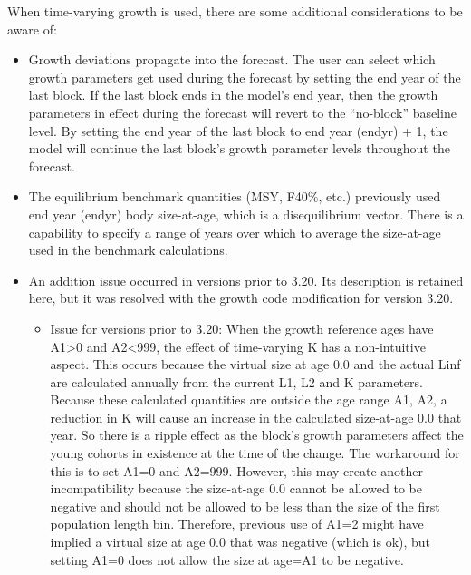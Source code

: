 When time-varying growth is used, there are some additional considerations to be aware of:
\begin{itemize}
	\item Growth deviations propagate into the forecast.  The user can select which growth parameters get used during the forecast by setting the end year of the last block.  If the last block ends in the model’s end year, then the growth parameters in effect during the forecast will revert to the “no-block” baseline level.  By setting the end year of the last block to end year (endyr) + 1, the model will continue the last block’s growth parameter levels throughout the forecast.
	\item The equilibrium benchmark quantities (MSY, F40\%, etc.) previously used end year (endyr) body size-at-age, which is a disequilibrium vector.  There is a capability to specify a range of years over which to average the size-at-age used in the benchmark calculations.
	\item An addition issue occurred in versions prior to 3.20.  Its description is retained here, but it was resolved with the growth code modification for version 3.20.
	\begin{itemize}
		\item Issue for versions prior to 3.20:  When the growth reference ages have A1>0 and A2<999, the effect of time-varying K has a non-intuitive aspect.  This occurs because the virtual size at age 0.0 and the actual Linf are calculated annually from the current L1, L2 and K parameters.  Because  these calculated quantities are outside the age range {A1, A2}, a reduction in K will cause an increase in the calculated size-at-age 0.0 that year.  So there is a ripple effect as the block’s  growth parameters affect the young cohorts in existence at the time of the change.  The workaround for this is to set A1=0 and A2=999.  However, this may create another incompatibility because the size-at-age 0.0 cannot be allowed to be negative and should not be allowed to be less than the size of the first population length bin.  Therefore, previous use of A1=2 might have implied a virtual size at age 0.0 that was negative (which is ok), but setting A1=0 does not allow the size at age=A1 to be negative.
	\end{itemize}
\end{itemize}


